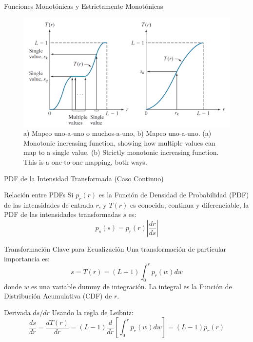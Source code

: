 \documentclass{beamer}
\begin{document}
\begin{frame}{Funciones Monotónicas y Estrictamente Monotónicas}
    \begin{figure}
      \centering
      \includegraphics[width=0.8\linewidth]{figuras/Fig_3_17.png}
      \caption{a) Mapeo uno-a-uno o muchos-a-uno, b) Mapeo uno-a-uno. (a) Monotonic
increasing function,
showing how
multiple values can
map to a single
value. (b) Strictly
monotonic increasing
function. This is
a one-to-one mapping,
both ways.}
    \end{figure}
\end{frame}

\begin{frame}{PDF de la Intensidad Transformada (Caso Continuo)}\tiny
  \begin{block}{\footnotesize{Relación entre PDFs}}
    Si $p_r(r)$ es la Función de Densidad de Probabilidad (PDF) de las intensidades de entrada $r$, y $T(r)$ es conocida, continua y diferenciable, la PDF de las intensidades transformadas $s$ es:
    \begin{equation}
      p_s(s) = p_r(r) \left| \frac{dr}{ds} \right|
    \end{equation}
  \end{block}
  \pause
  \begin{alertblock}{\footnotesize{Transformación Clave para Ecualización}}
    Una transformación de particular importancia es:
    \begin{equation}
      s = T(r) = (L-1) \int_{0}^{r} p_r(w) dw
    \end{equation}
    donde $w$ es una variable dummy de integración. La integral es la Función de Distribución Acumulativa (CDF) de $r$.
  \end{alertblock}
  \pause
  \begin{exampleblock}{\footnotesize{Derivada $ds/dr$}}
    Usando la regla de Leibniz:
    \begin{equation}
      \frac{ds}{dr} = \frac{dT(r)}{dr} = (L-1) \frac{d}{dr} \left[ \int_{0}^{r} p_r(w) dw \right] = (L-1) p_r(r)
    \end{equation}
  \end{exampleblock}
\end{frame}
\end{document}
